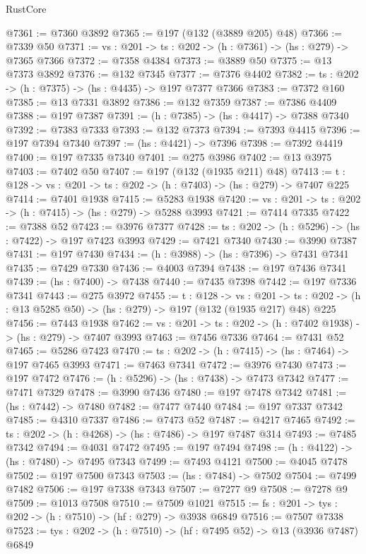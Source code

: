 \begin{lexlean}{RustCore}
\begin{coremodule}
@7361 := @7360 @3892
@7365 := @197 (@132 (@3889 @205) @48)
@7366 := @7339 @50
@7371 := {vs : @201} -> {ts : @202} -> (h : @7361) -> (hs : @279) -> @7365 @7366
@7372 := @7358 @4384
@7373 := @3889 @50
@7375 := @13 @7373 @3892
@7376 := @132 @7345
@7377 := @7376 @4402
@7382 := {ts : @202} -> (h : @7375) -> (hs : @4435) -> @197 @7377 @7366
@7383 := @7372 @160
@7385 := @13 @7331 @3892
@7386 := @132 @7359
@7387 := @7386 @4409
@7388 := @197 @7387
@7391 := (h : @7385) -> (hs : @4417) -> @7388 @7340
@7392 := @7383 @7333
@7393 := @132 @7373
@7394 := @7393 @4415
@7396 := @197 @7394 @7340
@7397 := (hs : @4421) -> @7396
@7398 := @7392 @4419
@7400 := @197 @7335 @7340
@7401 := @275 @3986
@7402 := @13 @3975
@7403 := @7402 @50
@7407 := @197 (@132 (@1935 @211) @48)
@7413 := {t : @128} -> {vs : @201} -> {ts : @202} -> (h : @7403) -> (hs : @279) -> @7407 @225
@7414 := @7401 @1938
@7415 := @5283 @1938
@7420 := {vs : @201} -> {ts : @202} -> (h : @7415) -> (hs : @279) -> @5288 @3993
@7421 := @7414 @7335
@7422 := @7388 @52
@7423 := @3976 @7377
@7428 := {ts : @202} -> (h : @5296) -> (hs : @7422) -> @197 @7423 @3993
@7429 := @7421 @7340
@7430 := @3990 @7387
@7431 := @197 @7430
@7434 := (h : @3988) -> (hs : @7396) -> @7431 @7341
@7435 := @7429 @7330
@7436 := @4003 @7394
@7438 := @197 @7436 @7341
@7439 := (hs : @7400) -> @7438
@7440 := @7435 @7398
@7442 := @197 @7336 @7341
@7443 := @275 @3972
@7455 := {t : @128} ->
  {vs : @201} ->
  {ts : @202} -> (h : @13 @5285 @50) -> (hs : @279) -> @197 (@132 (@1935 @217) @48) @225
@7456 := @7443 @1938
@7462 := {vs : @201} -> {ts : @202} -> (h : @7402 @1938) -> (hs : @279) -> @7407 @3993
@7463 := @7456 @7336
@7464 := @7431 @52
@7465 := @5286 @7423
@7470 := {ts : @202} -> (h : @7415) -> (hs : @7464) -> @197 @7465 @3993
@7471 := @7463 @7341
@7472 := @3976 @7430
@7473 := @197 @7472
@7476 := (h : @5296) -> (hs : @7438) -> @7473 @7342
@7477 := @7471 @7329
@7478 := @3990 @7436
@7480 := @197 @7478 @7342
@7481 := (hs : @7442) -> @7480
@7482 := @7477 @7440
@7484 := @197 @7337 @7342
@7485 := @4310 @7337
@7486 := @7473 @52
@7487 := @4217 @7465
@7492 := {ts : @202} -> (h : @4268) -> (hs : @7486) -> @197 @7487 @314
@7493 := @7485 @7342
@7494 := @4031 @7472
@7495 := @197 @7494
@7498 := (h : @4122) -> (hs : @7480) -> @7495 @7343
@7499 := @7493 @4121
@7500 := @4045 @7478
@7502 := @197 @7500 @7343
@7503 := (hs : @7484) -> @7502
@7504 := @7499 @7482
@7506 := @197 @7338 @7343
@7507 := @7277 @9
@7508 := @7278 @9
@7509 := @1013 @7508
@7510 := @7509 @1021
@7515 := {fs : @201} -> {tys : @202} -> (h : @7510) -> (hf : @279) -> @3938 @6849
@7516 := @7507 @7338
@7523 := {tys : @202} -> (h : @7510) -> (hf : @7495 @52) -> @13 (@3936 @7487) @6849

\end{coremodule}
\end{lexlean}

